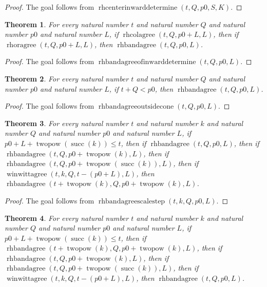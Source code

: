 \documentclass[11pt]{article}
\newtheorem{theorem}{Theorem}[section]
\theoremstyle{definition}
\begin{document}
\begin{proof}
The goal follows from \(\operatorname{rhcenterinwarddetermine}(t, Q, p0, S, K)\).
\end{proof}
\begin{theorem}
\label{ll:paper:rhbandagree-of-inward-determine}
For every natural number \(t\) and natural number \(Q\) and natural number \(p0\) and natural number \(L\), if \(\operatorname{rhcolagree}(t, Q, p0 + L, L)\), then if \(\operatorname{rhoragree}(t, Q, p0 + L, L)\), then \(\operatorname{rhbandagree}(t, Q, p0, L)\).
\end{theorem}
\begin{proof}
The goal follows from \(\operatorname{rhbandagreeofinwarddetermine}(t, Q, p0, L)\).
\end{proof}
\begin{theorem}
\label{ll:paper:rhbandagree-outside-cone}
For every natural number \(t\) and natural number \(Q\) and natural number \(p0\) and natural number \(L\), if \(t + Q < p0\), then \(\operatorname{rhbandagree}(t, Q, p0, L)\).
\end{theorem}
\begin{proof}
The goal follows from \(\operatorname{rhbandagreeoutsidecone}(t, Q, p0, L)\).
\end{proof}
\begin{theorem}
\label{ll:paper:rhbandagree-scale-step}
For every natural number \(t\) and natural number \(k\) and natural number \(Q\) and natural number \(p0\) and natural number \(L\), if \(p0 + L + \operatorname{twopow}(\operatorname{succ}(k)) \le t\), then if \(\operatorname{rhbandagree}(t, Q, p0, L)\), then if \(\operatorname{rhbandagree}(t, Q, p0 + \operatorname{twopow}(k), L)\), then if \(\operatorname{rhbandagree}(t, Q, p0 + \operatorname{twopow}(\operatorname{succ}(k)), L)\), then if \(\operatorname{winwittagree}(t, k, Q, t - (p0 + L), L)\), then \(\operatorname{rhbandagree}(t + \operatorname{twopow}(k), Q, p0 + \operatorname{twopow}(k), L)\).
\end{theorem}
\begin{proof}
The goal follows from \(\operatorname{rhbandagreescalestep}(t, k, Q, p0, L)\).
\end{proof}
\begin{theorem}
\label{ll:paper:rhbandagree-scale-inward-step}
For every natural number \(t\) and natural number \(k\) and natural number \(Q\) and natural number \(p0\) and natural number \(L\), if \(p0 + L + \operatorname{twopow}(\operatorname{succ}(k)) \le t\), then if \(\operatorname{rhbandagree}(t + \operatorname{twopow}(k), Q, p0 + \operatorname{twopow}(k), L)\), then if \(\operatorname{rhbandagree}(t, Q, p0 + \operatorname{twopow}(k), L)\), then if \(\operatorname{rhbandagree}(t, Q, p0 + \operatorname{twopow}(\operatorname{succ}(k)), L)\), then if \(\operatorname{winwittagree}(t, k, Q, t - (p0 + L), L)\), then \(\operatorname{rhbandagree}(t, Q, p0, L)\).
\end{theorem}
\end{document}
